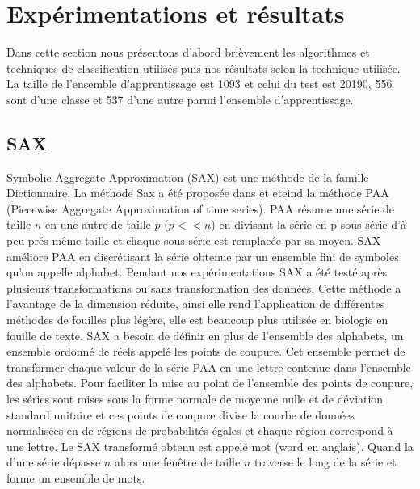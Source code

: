 \documentclass[french]{report}
\begin{document}
\section{Expérimentations et résultats}
Dans cette section nous présentons d'abord brièvement les algorithmes et techniques de classification utilisés puis  nos résultats selon la technique utilisée.
La taille de l'ensemble d'apprentissage est 1093 et celui du test est 20190, 556 sont d'une classe et 537 d'une autre parmi l'ensemble d'apprentissage.
\subsection{SAX}
Symbolic Aggregate Approximation (SAX) est une méthode de la famille Dictionnaire. La méthode Sax a été proposée dans \cite{sax} et eteind la méthode PAA (Piecewise Aggregate Approximation of time series). PAA résume une série de taille $n$ en une autre de taille $p$ ($p<<n$) en divisant la série en p sous série d'à peu prés même taille et chaque sous série  est remplacée par sa moyen. SAX améliore PAA en discrétisant la série obtenue par un ensemble fini de symboles qu'on appelle alphabet. Pendant nos expérimentations SAX a été testé après plusieurs transformations ou sans transformation des données. Cette méthode a l'avantage de la dimension réduite, ainsi elle rend l'application de différentes méthodes de fouilles plus légère, elle est beaucoup plus utilisée en biologie en fouille de texte. SAX a besoin de définir en plus de l'ensemble des alphabets, un ensemble ordonné de réels appelé les points de coupure. Cet ensemble permet de transformer chaque valeur de la série PAA en une lettre contenue dans l'ensemble des alphabets. Pour faciliter la mise au point de l'ensemble des points de coupure, les séries sont mises sous la forme normale de moyenne nulle et de déviation standard unitaire et ces points de coupure divise la courbe de données normalisées en de régions de probabilités égales et chaque région correspond à une lettre. Le SAX transformé obtenu est appelé mot (word en anglais). Quand la d'une série dépasse $n$ alors une fenêtre de taille $n$ traverse le long de la série et forme un ensemble de mots.\\
 
\end{document}
